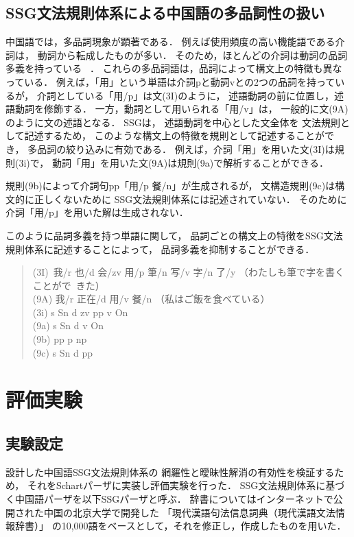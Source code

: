 \documentclass[japanese]{jnlp_1.3a}
\begin{document}
\subsection{SSG文法規則体系による中国語の多品詞性の扱い}
中国語では，多品詞現象が顕著である．
例えば使用頻度の高い機能語である介詞は，
動詞から転成したものが多い．
そのため，ほとんどの介詞は動詞の品詞多義を持っている
~\cite{zhu1}．
これらの多品詞語は，品詞によって構文上の特徴も異なっている．
例えば，「用」という単語は介詞pと動詞vとの2つの品詞を持っているが，
介詞としている「用/p」は文(3I)のように，
述語動詞の前に位置し，述語動詞を修飾する．
一方，動詞として用いられる「用/v」は，
一般的に文(9A)のように文の述語となる．
SSGは，
述語動詞を中心とした文全体を
文法規則として記述するため，
このような構文上の特徴を規則として記述することができ，
多品詞の絞り込みに有効である．
例えば，介詞「用」を用いた文(3I)は規則(3i)で，
動詞「用」を用いた文(9A)は規則(9a)で解析することができる．

規則(9b)によって介詞句pp「用/p 餐/n」が生成されるが，
文構造規則(9c)は構文的に正しくないために
SSG文法規則体系には記述されていない．
そのために介詞「用/p」を用いた解は生成されない．

このように品詞多義を持つ単語に関して，
品詞ごとの構文上の特徴をSSG文法規則体系に記述することによって，
品詞多義を抑制することができる．

\begin{quotation}\noindent
\文(3I)~我/r 也/d 会/zv 用/p 筆/n 写/v 字/n 了/y （わたしも筆で字を書くことがで\hspace*{4zw}~きた）\\
\文(9A) 我/r 正在/d 用/v 餐/n （私はご飯を食べている）\\
(3i) s \ya Sn d zv pp v On\\
(9a) s \ya Sn d v On\\
(9b) pp \ya p np\\
(9c) s \ya Sn d pp  
\end{quotation}

\section{評価実験}
\subsection{実験設定}
設計した中国語SSG文法規則体系の
網羅性と曖昧性解消の有効性を検証するため，
それをSchartパーザ\cite{schart}に実装し評価実験を行った．
SSG文法規則体系に基づく中国語パーザを以下SSGパーザと呼ぶ．
辞書についてはインターネットで公開された中国の北京大学で開発した 
「現代漢語句法信息詞典（現代漢語文法情報辞書）」\cite{yu}
の10,000語をベースとして，それを修正し，作成したものを用いた．
\end{document}

